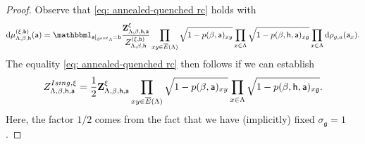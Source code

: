 \documentclass[11pt,a4paper]{article}
\theoremstyle{definition}
\numberwithin{equation}{section}
\newcommand\fg{\mathfrak{g}}
\begin{document}
\begin{proof}
Observe that \eqref{eq: annealed-quenched rc} holds with
\begin{equation}\label{eq: expression dmu section 6}
\mathrm{d}\mu_{\Lambda,\beta,\mathsf{h}}^{(\xi,\mathsf{b})}(\mathsf{a})=\mathbbm 1_{\mathsf a|_{\partial^{\rm ext}\Lambda}=\mathsf b} \frac{{\bf Z}^{\xi}_{\Lambda,\beta,\mathsf h, \mathsf a}}{Z^{(\xi,\mathsf{b})}_{\Lambda,\beta,\mathsf{h}}}\prod_{xy \in \overline{E}(\Lambda)} \sqrt{1-p(\beta,\mathsf a)_{xy}} \prod_{x\in \Lambda} \sqrt{1-p(\beta, \mathsf h, \mathsf a)_{x\fg}}
\prod_{x\in \Lambda}\mathrm{d} \rho_{g,a}(\mathsf{a}_x).  \end{equation}
The equality \eqref{eq: annealed-quenched rc} then follows if we can establish
\begin{equation}\label{eq: partition function equality}
Z^{\textup{Ising},\xi}_{\Lambda,\beta,\mathsf h, \mathsf{a}}=\frac{1}{2}{\bf Z}^{\xi}_{\Lambda,\beta, \mathsf h, \mathsf{a}}\prod_{xy \in \overline{E}(\Lambda)} \sqrt{1-p(\beta,\mathsf a)_{xy}} \prod_{x\in \Lambda} \sqrt{1-p(\beta, \mathsf h, \mathsf a)_{x\fg}}.
\end{equation}
Here, the factor $1/2$ comes from the fact that we have (implicitly) fixed $\sigma_{\fg}=1$.


\end{proof}
\end{document}
